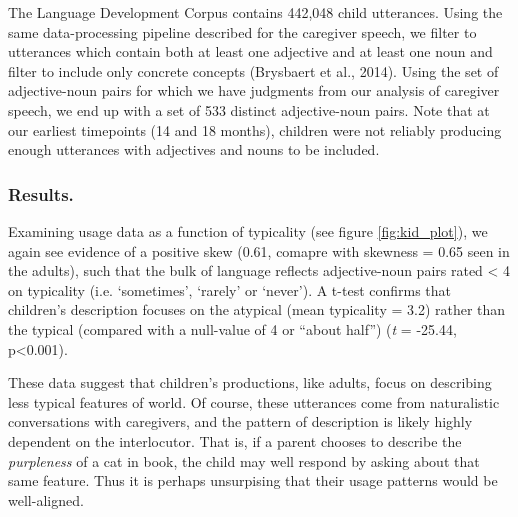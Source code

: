 \documentclass[10pt, letterpaper]{article}
\begin{document}
The Language Development Corpus contains 442,048 child utterances. Using
the same data-processing pipeline described for the caregiver speech, we
filter to utterances which contain both at least one adjective and at
least one noun and filter to include only concrete concepts (Brysbaert
et al., 2014). Using the set of adjective-noun pairs for which we have
judgments from our analysis of caregiver speech, we end up with a set of
533 distinct adjective-noun pairs. Note that at our earliest timepoints
(14 and 18 months), children were not reliably producing enough
utterances with adjectives and nouns to be included.

\hypertarget{results.}{%
\subsubsection{Results.}\label{results.}}

Examining usage data as a function of typicality (see figure
\ref{fig:kid_plot}), we again see evidence of a positive skew (0.61,
comapre with skewness = 0.65 seen in the adults), such that the bulk of
language reflects adjective-noun pairs rated \textless{} 4 on typicality
(i.e. `sometimes', `rarely' or `never'). A t-test confirms that
children's description focuses on the atypical (mean typicality = 3.2)
rather than the typical (compared with a null-value of 4 or ``about
half'') (\emph{t} = -25.44, p\textless{}0.001).

These data suggest that children's productions, like adults, focus on
describing less typical features of world. Of course, these utterances
come from naturalistic conversations with caregivers, and the pattern of
description is likely highly dependent on the interlocutor. That is, if
a parent chooses to describe the \emph{purpleness} of a cat in book, the
child may well respond by asking about that same feature. Thus it is
perhaps unsurpising that their usage patterns would be well-aligned.
\end{document}
